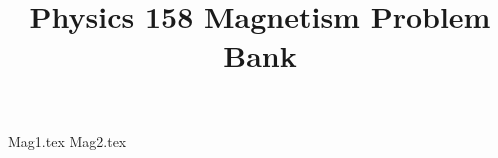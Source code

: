 \documentclass[11pt, fleqn]{article}
\title{Physics 158 Magnetism Problem Bank}
\author{}
\date{}
\begin{document}
\allowdisplaybreaks

\maketitle

{Mag1.tex}
{Mag2.tex}
\end{document}
